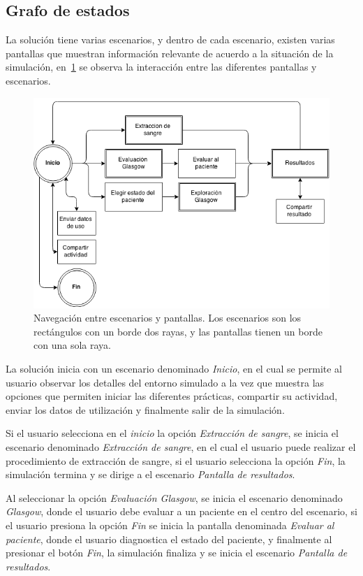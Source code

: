 \subsection{Grafo de estados}

La solución tiene varias escenarios, y dentro de cada escenario, existen varias
pantallas que muestran información relevante de acuerdo a la situación de la
simulación, en~\ref{fig:grafo_estados} se observa la interacción entre las
diferentes pantallas y escenarios.

\begin{figure}[H] 
\centering 
\includegraphics[scale=0.5]{propuesta/grafo_escenas.png}
\caption{Navegación entre escenarios y pantallas. Los escenarios son los
    rectángulos con un borde dos rayas, y las pantallas tienen un borde con una
    sola raya.}
\label{fig:grafo_estados}
\end{figure}

La solución inicia con un escenario denominado \emph{Inicio}, en el cual se
permite al usuario observar los detalles del entorno simulado a la vez que
muestra las opciones que permiten iniciar las diferentes prácticas, compartir
su actividad, enviar los datos de utilización y finalmente salir de la
simulación.

Si el usuario selecciona en el \emph{inicio} la opción \emph{Extracción de
    sangre}, se inicia el escenario denominado \emph{Extracción de sangre}, en
el cual el usuario puede realizar el procedimiento de extracción de sangre, si
el usuario selecciona la opción \emph{Fin}, la simulación termina y se dirige a
el escenario \emph{Pantalla de resultados}.

Al seleccionar la opción \emph{Evaluación Glasgow}, se inicia el escenario
denominado \emph{Glasgow}, donde el usuario debe evaluar a un paciente en el
centro del escenario, si el usuario presiona la opción \emph{Fin} se inicia la
pantalla denominada \emph{Evaluar al paciente}, donde el usuario diagnostica el
estado del paciente, y finalmente al presionar el botón \emph{Fin}, la
simulación finaliza y se inicia el escenario \emph{Pantalla de resultados}.

